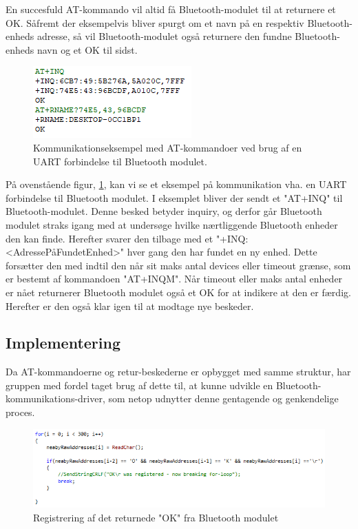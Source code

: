 En succesfuld AT-kommando vil altid få Bluetooth-modulet til at returnere et OK. Såfremt der eksempelvis bliver spurgt om et navn på en respektiv Bluetooth-enheds adresse, så vil Bluetooth-modulet også returnere den fundne Bluetooth-enheds navn og et OK til sidst. 

\begin{figure}[H]
	\centering
	\includegraphics[width = 200 pt]{Img/uart_eksempel.PNG}
	\caption{Kommunikationseksempel med AT-kommandoer ved brug af en UART forbindelse til Bluetooth modulet.}
	\label{fig:UART_eksempel}
\end{figure}

På ovenstående figur,  \ref{fig:UART_eksempel}, kan vi se et eksempel på kommunikation vha. en UART forbindelse til Bluetooth modulet. I eksemplet bliver der sendt et "AT+INQ" til Bluetooth-modulet. Denne besked betyder inquiry, og derfor går Bluetooth modulet straks igang med at undersøge hvilke nærtliggende Bluetooth enheder den kan finde. Herefter svarer den tilbage med et "+INQ:<AdressePåFundetEnhed>" hver gang den har fundet en ny enhed. Dette forsætter den med indtil den når sit maks antal devices eller timeout grænse, som er bestemt af kommandoen "AT+INQM". Når timeout eller maks antal enheder er nået returnerer Bluetooth modulet også et OK for at indikere at den er færdig. Herefter er den også klar igen til at modtage nye beskeder.

\subsection{Implementering}

Da AT-kommandoerne og retur-beskederne er opbygget med samme struktur, har gruppen med fordel taget brug af dette til, at kunne udvikle en Bluetooth-kommunikations-driver, som netop udnytter denne gentagende og genkendelige proces. 

\begin{figure}[H]
	\centering
	\includegraphics[width = 400 pt]{Img/OK_registrered.PNG}
	\caption{Registrering af det returnede "OK" fra Bluetooth modulet}
	\label{fig:OK_registrered}
\end{figure}

